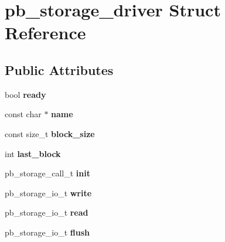 \hypertarget{structpb__storage__driver}{}\section{pb\+\_\+storage\+\_\+driver Struct Reference}
\label{structpb__storage__driver}
\subsection*{Public Attributes}
\begin{DoxyCompactItemize}
\item 
\mbox{\label{structpb__storage__driver_ae9db5ff1d7571fa49db466976208ec92}} 
bool {\bfseries ready}
\item 
\mbox{\label{structpb__storage__driver_a0165f88905a4d36e0554d615f70240c7}} 
const char $\ast$ {\bfseries name}
\item 
\mbox{\label{structpb__storage__driver_a99c2617854098bde0bfc765be19b6c84}} 
const size\+\_\+t {\bfseries block\+\_\+size}
\item 
\mbox{\label{structpb__storage__driver_a65e6e83ef322392e8499725c761c5dcc}} 
int {\bfseries last\+\_\+block}
\item 
\mbox{\label{structpb__storage__driver_a602e08a1d0a5694933b023e7cf11a0a5}} 
pb\+\_\+storage\+\_\+call\+\_\+t {\bfseries init}
\item 
\mbox{\label{structpb__storage__driver_a0650e0ace84763e23cdbb80e120a9822}} 
pb\+\_\+storage\+\_\+io\+\_\+t {\bfseries write}
\item 
\mbox{\label{structpb__storage__driver_a88d7474a091fb99580edd9ffc4b47da9}} 
pb\+\_\+storage\+\_\+io\+\_\+t {\bfseries read}
\item 
\mbox{\label{structpb__storage__driver_ae1647901e1c714f50b3e7a18a97d58d1}} 
pb\+\_\+storage\+\_\+io\+\_\+t {\bfseries flush}
\item 
\mbox{\label{structpb__storage__driver_ac5d38810dc9fceaf5248347056d1821c}} 

\end{DoxyCompactItemize}
